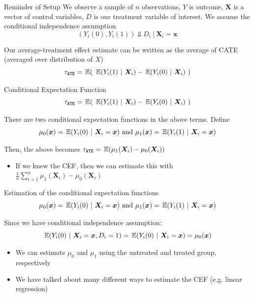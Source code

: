 \documentclass[aspectratio=169,t,11pt,table]{beamer}
\begin{document}
\begin{frame}{Reminder of Setup}
  We observe a sample of $n$ observations, $Y$ is outcome, $\bm{X}$ is a vector of control variables, $D$ is our treatment variable of interest. We assume the conditional independence assumption
  $$
    (Y_{i}(0), Y_{i}(1)) \Perp D_i \ \vert \ \bm{X}_i = \bm{x}
  $$

  \pause
  \bigskip
  Our average-treatment effect estimate can be written as the average of CATE (averaged over distribution of $X$)
  $$
    \tau_{\texttt{ATE}} = \expec{\ \expec{Y_i(1)}{\bm{X}_i} - \expec{Y_i(0)}{\bm{X}_i} \ }
  $$
\end{frame}

\begin{frame}{Conditional Expectation Function}
  $$
  \tau_{\texttt{ATE}} = \expec{\ \expec{Y_i(1)}{\bm{X}_i} - \expec{Y_i(0)}{\bm{X}_i} \ }
  $$

  There are two conditional expectation functions in the above terms. Define
  $$
    \mu_0(\bm{x}) = \expec{Y_i(0)}{\bm{X}_i = \bm{x}} 
    \text{ and }
    \mu_1(\bm{x}) = \expec{Y_i(1)}{\bm{X}_i = \bm{x}}
  $$

  \pause
  \bigskip
  Then, the above becomes $\tau_{\texttt{ATE}} = \expec{ \mu_1(\bm{X}_i) - \mu_0(\bm{X}_i) }$
  \begin{itemize}
    \item If we knew the CEF, then we can estimate this with $\frac{1}{n} \sum_{i=1}^n \mu_1(\bm{X}_i) - \mu_0(\bm{X}_i)$
  \end{itemize}
\end{frame}

\begin{frame}{Estimation of the conditional expectation functions}
  \vspace*{-\bigskipamount}
  $$
    \mu_0(\bm{x}) = \expec{Y_i(0)}{\bm{X}_i = \bm{x}} 
    \text{ and }
    \mu_1(\bm{x}) = \expec{Y_i(1)}{\bm{X}_i = \bm{x}}
  $$

  \bigskip
  Since we have conditional independence assumption: 
  $$
    \expec{Y_i(0)}{\bm{X}_i = \bm{x}, D_i = 1} = \expec{Y_i(0)}{\bm{X}_i = \bm{x}} = \mu_0(\bm{x})
  $$ 
  \begin{itemize}
    \item We can estimate $\mu_0$ and $\mu_1$ using the untreated and treated group, respectively

    \item We have talked about many different ways to estimate the CEF (e.g. linear regression)
  \end{itemize}
\end{frame}
\end{document}
